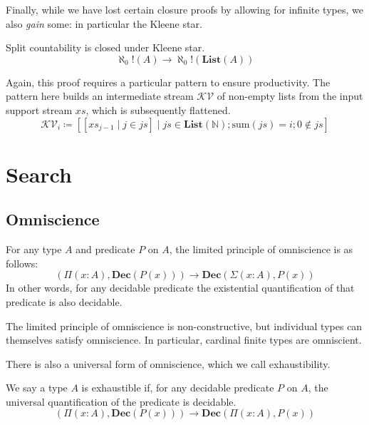 Finally, while we have lost certain closure proofs by allowing for infinite
types, we also \emph{gain} some: in particular the Kleene star.
\begin{theorem}
  Split countability is closed under Kleene star.
  \begin{equation}
    \aleph_0!(A) \rightarrow \aleph_0!(\mathbf{List}(A))
  \end{equation}
\end{theorem}
Again, this proof requires a particular pattern to ensure productivity.
The pattern here builds an intermediate stream \(\mathcal{KV}\) of non-empty
lists from the input support stream \(\mathit{xs}\), which is subsequently
flattened.
\begin{equation}
  \mathcal{KV}_i \coloneqq \left[ \left[ \mathit{xs}_{j - 1} \mid j \in \mathit{js} \right] \mid \mathit{js} \in \mathbf{List}(\mathbb{N}) ; \text{sum}(\mathit{js}) = i ; 0 \notin \mathit{js}  \right]
\end{equation}
\section{Search} \label{search}
\subsection{Omniscience}
\begin{definition}
  For any type \(A\) and predicate \(P\) on \(A\), the limited principle of
  omniscience \cite{myhillErrettBishopFoundations1972} is as follows:
  \begin{equation}
    \left( \Pi {(x : A)} , \mathbf{Dec}(P(x)) \right) \rightarrow \mathbf{Dec} \left( \Sigma {(x : A)} , P(x) \right)
  \end{equation}
  In other words, for any decidable predicate the existential quantification of
  that predicate is also decidable.
\end{definition}
The limited principle of omniscience is non-constructive, but individual types
can themselves satisfy omniscience.
In particular, cardinal finite types are omniscient.

There is also a universal form of omniscience, which we call exhaustibility.
\begin{definition}[Exhaustibility]
  We say a type \(A\) is exhaustible if, for any decidable predicate \(P\) on
  \(A\), the universal quantification of the predicate is decidable.
  \begin{equation}
    \left( \Pi {(x : A)} , \mathbf{Dec}(P(x)) \right) \rightarrow \mathbf{Dec} \left( \Pi {(x : A)} , P(x) \right)
  \end{equation}
\end{definition}

